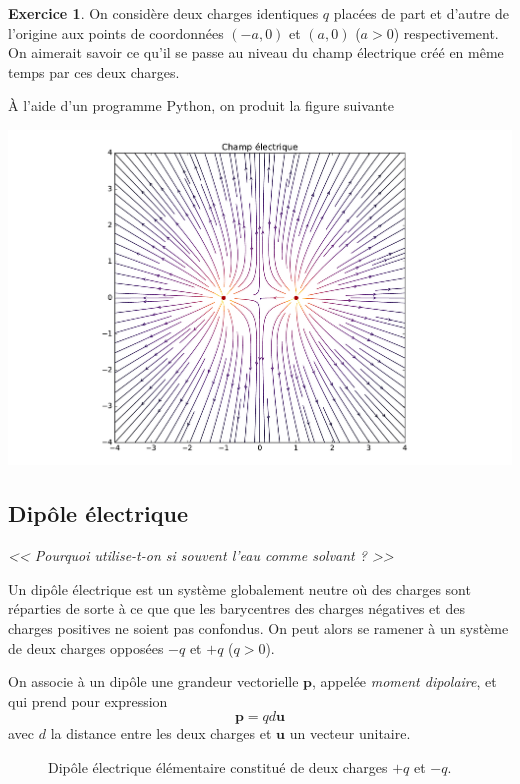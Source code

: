 \documentclass{article}
\renewcommand{\vec}[1]{\boldsymbol{\mathbf{#1}}}
\theoremstyle{definition}
\newtheorem{exo}{Exercice}
\theoremstyle{remark}
\begin{document}
\begin{exo}
	On considère deux charges identiques $q$ placées de part et d'autre de l'origine aux points de coordonnées $(-a,0)$ et $(a,0)$ ($a>0$) respectivement. On aimerait savoir ce qu'il se passe au niveau du champ électrique créé en même temps par ces deux charges.
	
	À l'aide d'un programme \textsf{Python}, on produit la figure suivante
	
	\includegraphics[width=\textwidth]{parts/electrostat/Champ_exo1.pdf}
\end{exo}

\subsection{Dipôle électrique}

\begin{center}
	\textit{<< Pourquoi utilise-t-on si souvent l'eau comme solvant ? >>}
\end{center}

Un dipôle électrique est un système globalement neutre où des charges sont réparties de sorte à ce que que les barycentres des charges négatives et des charges positives ne soient pas confondus. On peut alors se ramener à un système de deux charges opposées $-q$ et $+q$ ($q>0$).

On associe à un dipôle une grandeur vectorielle $\vec{p}$, appelée \textit{moment dipolaire}, et qui prend pour expression
	\[ 
	\vec{p} = qd\vec{u}
	 \]
avec $d$ la distance entre les deux charges et $\vec{u}$ un vecteur unitaire.

\begin{figure}[H]
	\centering
	\caption{Dipôle électrique élémentaire constitué de deux charges $+q$ et $-q$.}
\end{figure}
\end{document}
